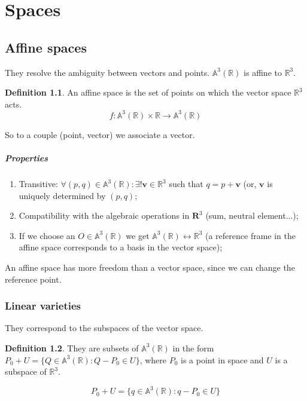 \documentclass[12pt,a4paper]{report}
\numberwithin{equation}{section}
\theoremstyle{definition}
\newtheorem{definition}{Definition}[section]
\theoremstyle{remark}
\begin{document}
\chapter{Spaces}

\section{Affine spaces}

They resolve the ambiguity between vectors and points. $\mathbb{A}^3 (\mathbb{R})$ is affine to $\mathbb{R}^3$.

\begin{definition}
An affine space is the set of points on which the vector space $\mathbb{R}^3$ acts.
\begin{equation}
f: \mathbb{A}^3 (\mathbb{R}) \times \mathbb{R} \rightarrow \mathbb{A}^3 (\mathbb{R})
\end{equation}

So to a couple (point, vector) we associate a vector.
\end{definition}

\paragraph{Properties}

\begin{enumerate}
\item Transitive: $\forall (p, q) \in \mathbb{A}^3 (\mathbb{R}): \exists ! \mathbf{v} \in \mathbb{R}^3$  such that  $q = p+\mathbf{v}$ (or, $\mathbf{v}$ is uniquely determined by $(p, q)$;
\item Compatibility with the algebraic operations in $\mathbf{R}^3$ (sum, neutral element...);
\item If we choose an $O \in \mathbb{A}^3 (\mathbb{R})$ we get $\mathbb{A}^3 (\mathbb{R}) \leftrightarrow \mathbb{R}^3$ (a reference frame in the affine space corresponds to a basis in the vector space);
\end{enumerate}

An affine space has more freedom than a vector space, since we can change the reference point.

\subsection{Linear varieties}

They correspond to the subspaces of the vector space. 

\begin{definition}
They are subsets of $\mathbb{A}^3 (\mathbb{R})$ in the form $P_0 + U = \lbrace Q \in \mathbb{A}^3 (\mathbb{R}) : Q-P_0 \in U\rbrace$, where $P_0$ is a point in space and $U$ is a subspace of $\mathbb{R}^3$.

\begin{equation}
P_0 + U = \lbrace q \in \mathbb{A}^3 (\mathbb{R}): q-P_0 \in U\rbrace
\end{equation}
\end{definition}
\end{document}
